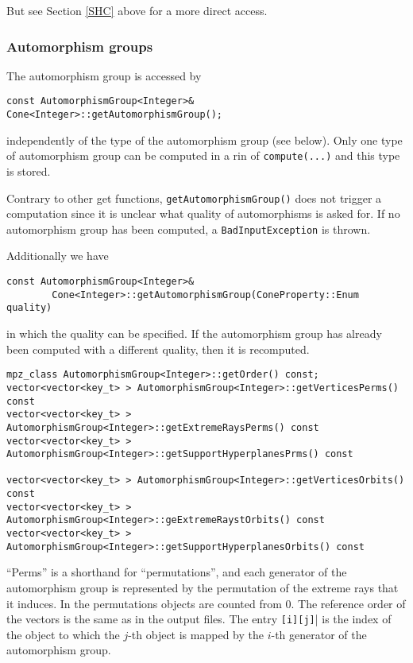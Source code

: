 \documentclass[12pt,a4paper]{scrartcl}
\theoremstyle{definition}
\begin{document}
\begin{small}
But see Section \ref{SHC} above for a more direct access.

\subsubsection{Automorphism groups}

The automorphism group is accessed by

\begin{Verbatim}
const AutomorphismGroup<Integer>& Cone<Integer>::getAutomorphismGroup();
\end{Verbatim}
independently of the type of the automorphism group (see below). Only one type of automorphism group can be computed in a rin of \verb|compute(...)| and this type is stored.

Contrary to other get functions, \verb|getAutomorphismGroup()| does not trigger a computation since it is unclear what quality of automorphisms is asked for. If no automorphism group has been computed, a \verb|BadInputException| is thrown.

Additionally we have
\begin{Verbatim}
const AutomorphismGroup<Integer>& 
		Cone<Integer>::getAutomorphismGroup(ConeProperty::Enum quality)
\end{Verbatim}
in which the quality can be specified. If the automorphism group has already been computed with a different quality, then it is recomputed.


\begin{Verbatim}
mpz_class AutomorphismGroup<Integer>::getOrder() const;
vector<vector<key_t> > AutomorphismGroup<Integer>::getVerticesPerms() const
vector<vector<key_t> > AutomorphismGroup<Integer>::getExtremeRaysPerms() const
vector<vector<key_t> > AutomorphismGroup<Integer>::getSupportHyperplanesPrms() const

vector<vector<key_t> > AutomorphismGroup<Integer>::getVerticesOrbits() const
vector<vector<key_t> > AutomorphismGroup<Integer>::geExtremeRaystOrbits() const
vector<vector<key_t> > AutomorphismGroup<Integer>::getSupportHyperplanesOrbits() const
 \end{Verbatim}
 
 ``Perms'' is a shorthand for ``permutations'', and each generator of the automorphism group is represented by the permutation of the extreme rays that it induces.   In the permutations objects are counted from $0$. The reference order of the vectors is the same as in the output files. The entry \verb|[i][j]|| is the index of the object to which the $j$-th object is mapped by the $i$-th generator of the automorphism group.
 

\end{small}
\end{document}
